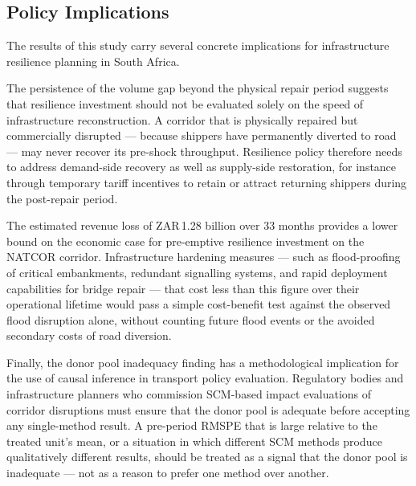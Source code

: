 \subsection{Policy Implications}
\label{sec:disc_policy}

The results of this study carry several concrete implications for
infrastructure resilience planning in South Africa.

The persistence of the volume gap beyond the physical repair period
suggests that resilience investment should not be evaluated solely
on the speed of infrastructure reconstruction.
A corridor that is physically repaired but commercially disrupted
--- because shippers have permanently diverted to road --- may
never recover its pre-shock throughput.
Resilience policy therefore needs to address demand-side recovery
as well as supply-side restoration, for instance through temporary
tariff incentives to retain or attract returning shippers during
the post-repair period.

The estimated revenue loss of ZAR\,1.28 billion over 33 months
provides a lower bound on the economic case for pre-emptive
resilience investment on the NATCOR corridor.
Infrastructure hardening measures --- such as flood-proofing of
critical embankments, redundant signalling systems, and rapid
deployment capabilities for bridge repair --- that cost less than
this figure over their operational lifetime would pass a simple
cost-benefit test against the observed flood disruption alone,
without counting future flood events or the avoided secondary
costs of road diversion.

Finally, the donor pool inadequacy finding has a methodological
implication for the use of causal inference in transport policy
evaluation.
Regulatory bodies and infrastructure planners who commission
SCM-based impact evaluations of corridor disruptions must ensure
that the donor pool is adequate before accepting any single-method
result.
A pre-period RMSPE that is large relative to the treated unit's
mean, or a situation in which different SCM methods produce
qualitatively different results, should be treated as a signal
that the donor pool is inadequate --- not as a reason to prefer
one method over another.
